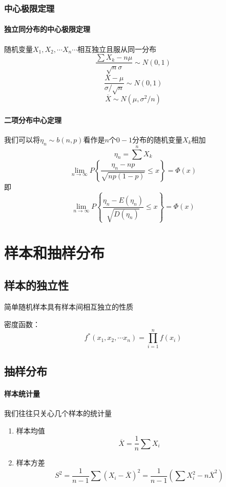\documentclass[12pt]{report}
\begin{document}
\subsubsection{中心极限定理}
\paragraph{独立同分布的中心极限定理}
随机变量$X_1,X_2,\cdots X_n \cdots$相互独立且服从同一分布
$$\frac{\sum X_k-n\mu}{\sqrt{n}\sigma} \sim N(0,1)$$
$$\frac{\overline{X}-\mu}{\sigma/\sqrt{n}} \sim N(0,1)$$
$$\overline{X} \sim N(\mu,\sigma ^2/n)$$

\paragraph{二项分布中心定理}
我们可以将$\eta_n \sim b(n,p)$看作是$n$个$0-1分布$的随机变量$X_k$相加
$$\eta_n =\sum^n X_k$$
$$\lim_{n\rightarrow \infty}P \left\{\frac{\eta_n-np}{\sqrt{np(1-p)}}\leqslant x\right\}=\varPhi(x)$$
即
$$\lim_{n\rightarrow \infty}P \left\{\frac{\eta_n-E(\eta_n)}{\sqrt{D(\eta_n)}}\leqslant x\right\}=\varPhi(x)$$
\section{样本和抽样分布}

\subsection{样本的独立性}简单随机样本具有样本间相互独立的性质\par
密度函数：
$$f^*(x_1,x_2,\cdots x_n)=\prod_{i=1}^n f(x_i)$$

\subsection{抽样分布}
\paragraph{样本统计量}我们往往只关心几个样本的统计量
\begin{enumerate}
    \item 样本均值$$\overline{X}=\frac{1}{n}\sum X_i$$
    \item 样本方差$$S^2=\frac{1}{n-1}\sum(X_i-\overline{X})^2=\frac{1}{n-1}\left(\sum X^2_i-n\overline{X}^2\right)$$
\end{enumerate}
\end{document}
